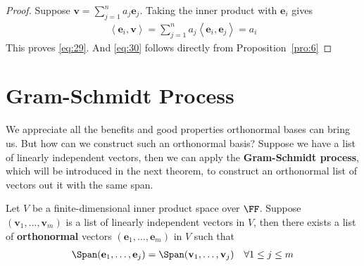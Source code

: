 \documentclass[thmcnt=section, color=blue, 12pt]{my-elegantbook}
\begin{document}
\begin{proof}
    Suppose $\mathbf{v} = \sum_{j=1}^n a_j \mathbf{e}_j$. Taking the inner product with $\mathbf{e}_i$ gives 
    \begin{align*}
        \left\langle \mathbf{e}_i, \mathbf{v} \right\rangle
        = \sum_{j=1}^n a_j \left\langle \mathbf{e}_i, \mathbf{e}_j \right\rangle
        = a_i
    \end{align*}
    This proves \eqref{eq:29}. And \eqref{eq:30} follows directly from Proposition~\ref{pro:6}
\end{proof}


\section{Gram-Schmidt Process} \label{sec:1}

We appreciate all the benefits and good properties orthonormal bases can bring us. But how can we construct such an orthonormal basis? Suppose we have a list of linearly independent vectors, then we can apply the \textbf{Gram-Schmidt process}, which will be introduced in the next theorem, to construct an orthonormal list of vectors out it with the same span.

\begin{theorem} \label{thm:1}
    Let $V$ be a finite-dimensional inner product space over $\FF$. Suppose $(\mathbf{v}_1, \ldots, \mathbf{v}_m)$ is a list of linearly independent vectors in $V$, then there exists a list of \textbf{orthonormal} vectors $(\mathbf{e}_1, \ldots, \mathbf{e}_m)$ in $V$ such that 
    \begin{align}
        \Span(\mathbf{e}_1, \ldots, \mathbf{e}_j)
        = \Span(\mathbf{v}_1, \ldots, \mathbf{v}_j)
        \quad \forall 1 \leq j \leq m
        \label{eq:3}
    \end{align}
\end{theorem}
\end{document}
